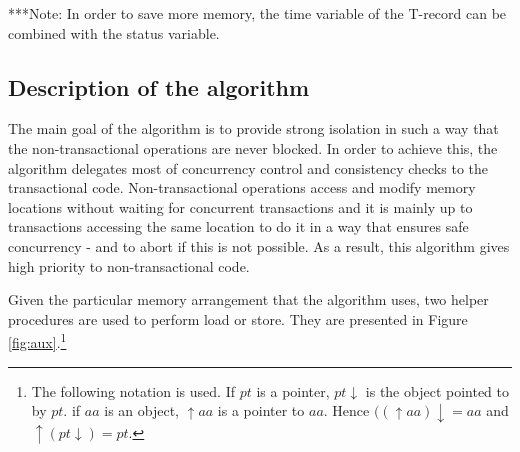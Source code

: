 \documentclass[11pt,letterpaper]{article}
\begin{document}
***Note: In order to save more memory, the time variable of the T-record can be combined
with the status variable.


\subsection{Description of the algorithm}

The main goal of the algorithm is to provide strong isolation 
in such a way that  the non-transactional  operations are never blocked. 
In order  to achieve this,  the algorithm delegates most of  
concurrency   control   and  consistency   checks   to  the   transactional
code. Non-transactional  
operations access and modify  memory  locations without waiting for concurrent transactions
 and it is mainly up to transactions accessing the same location to
do it in a way that ensures safe  
concurrency - and to abort if this  is not possible.  As a
result, this algorithm gives high  priority   to non-transactional code. 

Given the particular memory arrangement  that the algorithm uses, two helper
procedures are used  to perform load  or store. They are
presented  in  Figure  \ref{fig:aux}.\footnote{The following  notation  is
used. If $pt$ is a pointer, $pt\downarrow$ is the object pointed to by $pt$. 
if $aa$ is an object, $\uparrow aa$ is a pointer to $aa$. Hence 
$((\uparrow aa)\downarrow =aa$ and $ \uparrow(pt \downarrow)=pt$.}


\begin{figure}[htb]
\end{figure}
\end{document}
